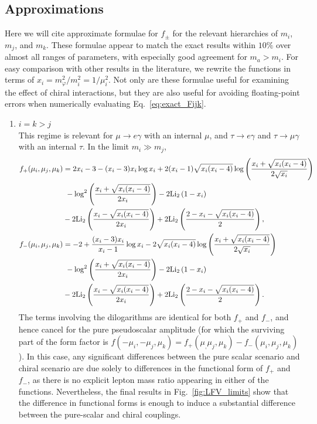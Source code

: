 {\subsection{Approximations}\label{sec:transition_approx}

Here we will cite approximate formulae for $f_{\pm}$ for the relevant hierarchies of $m_i$, $m_j$, and $m_k$. These formulae appear to match the exact results within $10\%$ over almost all ranges of parameters, with especially good agreement for $m_a > m_i$. For easy comparison with other results in the literature, we rewrite the functions in terms of $x_i = m_\varphi^2/m_i^2 = 1/\mu_i^2$. Not only are these formulae useful for examining the effect of chiral interactions, but they are also useful for avoiding floating-point errors when numerically evaluating Eq.~\ref{eq:exact_Fijk}.

\begin{enumerate}
    \item $i = k > j$\\
    This regime is relevant for $\mu \rightarrow e\gamma$ with an internal $\mu$, and $\tau \rightarrow e\gamma$ and $\tau \rightarrow \mu \gamma$ with an internal $\tau$. In the limit $m_i \gg m_j$,
        \begin{align}
        f_+(\mu_i,\mu_j,\mu_k) &= 2x_i-3 - (x_i - 3)x_i\log{x_i} + 2(x_i-1)\sqrt{x_i(x_i - 4)}\log\left(\frac{x_i+\sqrt{x_i(x_i - 4)}}{2\sqrt{x_i}}\right) \nonumber\\
        &\ - \log^2\left(\frac{x_i+\sqrt{x_i(x_i-4)}}{2x_i}\right) - 2{\rm Li}_2\left(1-x_i\right)\nonumber\\
        & - 2{\rm Li}_2\left(\frac{x_i - \sqrt{x_i(x_i-4)}}{2x_i}\right) + 2{\rm Li}_2\left(\frac{2-x_i - \sqrt{x_i(x_i-4)}}{2}\right),\nonumber\\
        f_-(\mu_i,\mu_j,\mu_k) &=-2 + \frac{(x_i - 3)x_i}{x_i-1}\log{x_i} - 2\sqrt{x_i(x_i - 4)}\log\left(\frac{x_i+\sqrt{x_i(x_i - 4)}}{2\sqrt{x_i}}\right)\nonumber\\
        &\ - \log^2\left(\frac{x_i+\sqrt{x_i(x_i-4)}}{2x_i}\right) - 2{\rm Li}_2\left(1-x_i\right)\nonumber\\
        & - 2{\rm Li}_2\left(\frac{x_i - \sqrt{x_i(x_i-4)}}{2x_i}\right) + 2{\rm Li}_2\left(\frac{2-x_i - \sqrt{x_i(x_i-4)}}{2}\right).
        \end{align}
        The terms involving the dilogarithms are identical for both $f_+$ and $f_-$, and hence cancel for the pure pseudoscalar amplitude (for which the surviving part of the form factor is $f(-\mu_i, -\mu_j, \mu_k) = f_+(\mu_, \mu_j, \mu_k) - f_-(\mu_i, \mu_j, \mu_k)$). In this case, any significant differences between the pure scalar scenario and chiral scenario are due solely to differences in the functional form of $f_+$ and $f_-$, as there is no explicit lepton mass ratio appearing in either of the functions. Nevertheless, the final results in Fig.~\ref{fig:LFV_limits}  show that the difference in functional forms is enough to induce a substantial difference between the pure-scalar and chiral couplings.
        

\end{enumerate}}
